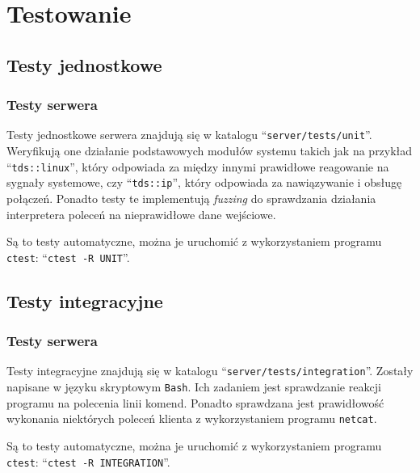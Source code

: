 \documentclass[8pt,a4paper]{article}
\newcommand{\quotes}[1]{``#1''}
\newcommand{\quotcode}[1]{\quotes{\texttt{#1}}}
\begin{document}
\pagebreak
\section{Testowanie}

\subsection{Testy jednostkowe}
\subsubsection{Testy serwera}
Testy jednostkowe serwera znajdują się w katalogu \quotcode{server/tests/unit}. Weryfikują one działanie podstawowych modułów systemu takich jak na przykład \quotcode{tds::linux}, który odpowiada za między innymi prawidłowe reagowanie na sygnały systemowe, czy \quotcode{tds::ip}, który odpowiada za nawiązywanie i obsługę połączeń. Ponadto testy te implementują \textit{fuzzing} do sprawdzania działania interpretera poleceń na nieprawidłowe dane wejściowe.

Są to testy automatyczne, można je uruchomić z wykorzystaniem programu \texttt{ctest}: \quotcode{ctest -R UNIT}.

\subsection{Testy integracyjne}
\subsubsection{Testy serwera}
Testy integracyjne znajdują się w katalogu \quotcode{server/tests/integration}. Zostały napisane w języku skryptowym \texttt{Bash}. Ich zadaniem jest sprawdzanie reakcji programu na polecenia linii komend. Ponadto sprawdzana jest prawidłowość wykonania niektórych poleceń klienta z wykorzystaniem programu \texttt{netcat}.

Są to testy automatyczne, można je uruchomić z wykorzystaniem programu \texttt{ctest}: \quotcode{ctest -R INTEGRATION}.
\end{document}
